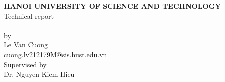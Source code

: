 \makeatletter
\begin{titlepage}
\begin{center}

\uppercase{\textbf{\large{Hanoi University Of Science and Technology}}}
\\[5cm]

{{\Large{Technical report}}}
\\[0.5cm]
\uppercase{\textbf{\Large{\@title}}}
\\[2cm]

by \\
\Large{Le Van Cuong}\\
\normalsize{\url{cuong.lv212179M@sis.hust.edu.vn}}\\[1cm]

Supervised by \\
\Large{Dr. Nguyen Kiem Hieu}\\


\vfill
\normalsize{\@date}

\end{center}
\end{titlepage}
\makeatother
